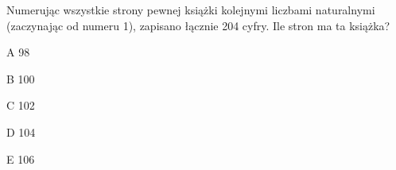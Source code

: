 \begin{tresc}
Numerując wszystkie strony pewnej książki kolejnymi liczbami naturalnymi (zaczynając od numeru 1), zapisano łącznie 204 cyfry. Ile stron ma ta książka?
\end{tresc}
\begin{wariant}{A} 98 \end{wariant}
\begin{wariant}{B} 100 \end{wariant}
\begin{wariant}{C} 102 \end{wariant}
\begin{wariant}{D} 104 \end{wariant}
\begin{wariant}{E} 106 \end{wariant}
